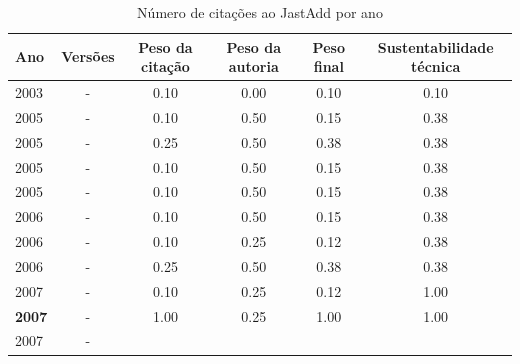 \begin{table}[H]
\caption{Número de citações ao JastAdd por ano}
\centering
\begin{tabular}{| l | c | c | c | c | c |}
  \hline
  Ano & Versões & Peso da citação & Peso da autoria & Peso final & Sustentabilidade técnica \\
  \hline
            2003
          &
          -
          &
          0.10
          &
          0.00
          &
          0.10
          &
            {\color{red} 0.10}
          \\
\hline
            2005
          &
          -
          &
          0.10
          &
          0.50
          &
          0.15
          &
            {\color{red} 0.38}
          \\
            2005
          &
          -
          &
          0.25
          &
          0.50
          &
          0.38
          &
            {\color{red} 0.38}
          \\
            2005
          &
          -
          &
          0.10
          &
          0.50
          &
          0.15
          &
            {\color{red} 0.38}
          \\
            2005
          &
          -
          &
          0.10
          &
          0.50
          &
          0.15
          &
            {\color{red} 0.38}
          \\
\hline
            2006
          &
          -
          &
          0.10
          &
          0.50
          &
          0.15
          &
            {\color{red} 0.38}
          \\
            2006
          &
          -
          &
          0.10
          &
          0.25
          &
          0.12
          &
            {\color{red} 0.38}
          \\
            2006
          &
          -
          &
          0.25
          &
          0.50
          &
          0.38
          &
            {\color{red} 0.38}
          \\
\hline
            2007
          &
          -
          &
          0.10
          &
          0.25
          &
          0.12
          &
            {\color{blue} 1.00}
          \\
            {\bf 2007}
          &
          -
          &
          1.00
          &
          0.25
          &
          1.00
          &
            {\color{blue} 1.00}
          \\
            2007
          &
          -

\end{tabular}
\end{table}
